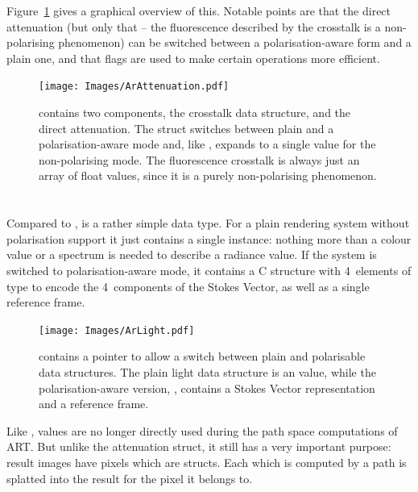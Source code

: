 Figure~\ref{fig:arattenuation} gives a graphical overview of this. Notable points are that the direct attenuation (but only that -- the fluorescence described by the crosstalk is a non-polarising phenomenon) can be switched between a polarisation-aware form and a plain one, and that flags are used to make certain operations more efficient.

\begin{figure}[htb]
\begin{center}
\texttt{[image: Images/ArAttenuation.pdf]} 
\end{center}
\caption{
\label{fig:arattenuation} 
 contains two components, the crosstalk data structure, and the direct attenuation. The  struct switches between plain and a polarisation-aware mode and, like , expands to a single  value for the non-polarising mode. The fluorescence crosstalk is always just an array of float values, since it is a purely non-polarising phenomenon.
}
\end{figure}

\section{}
Compared to ,  is a rather simple data type. For a plain rendering system without
polarisation support it just contains a single  instance: nothing more than a colour value or a spectrum is needed to describe a radiance value. If the system is switched to polarisation-aware mode, it contains a C structure with 4~elements of type  to encode the 4~components of the Stokes Vector, as well as a single reference frame.

\begin{figure}[htb]
\begin{center}
\texttt{[image: Images/ArLight.pdf]} 
\end{center}
\caption{
\label{fig:arlight} 
 contains a  pointer to allow a switch between plain and polarisable data structures. The plain light data structure is an  value, while the polarisation-aware version, , contains a Stokes Vector representation and a reference frame.
}
\end{figure}

Like ,  values are no longer directly used during the path space computations of ART. But unlike the attenuation struct, it still has a very important purpose:  result images have pixels which are  structs. Each  which is computed by a path is splatted into the result  for the pixel it belongs to.

